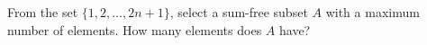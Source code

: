 From the set $\{1, 2, \ldots, 2n + 1\}$, select a sum-free subset $A$ with a maximum number of elements. How many elements does $A$ have?
